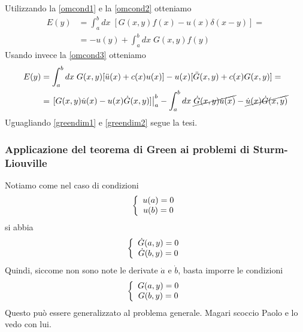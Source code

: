 Utilizzando la \ref{omcond1} e la \ref{omcond2} otteniamo
\begin{align}
	E(y) &= \int_{a}^{b} dx \; [G(x,y) f(x) - u(x)  \delta(x-y)] = \nonumber \\
		 &= -u(y) +\int_{a}^{b} dx \; G(x,y) f(y) \label{greendim1}
\end{align}
Usando invece la \ref{omcond3} otteniamo
\begin{align}
	E(y) &= \int_{a}^{b} dx \; G(x,y) [\ddot{u}(x) + c(x)u(x)] - u(x)  [\ddot{G}(x,y) + c(x) G(x,y)] = \nonumber\\
	&= \left.[G(x,y)\dot{u}(x) - u(x)\dot{G}(x,y)]\right|_a^b - \int_{a}^{b} dx \; \cancel{\dot{G}(x,y) \dot{u}(x)} - \cancel{\dot{u}(x) \dot{G}(x,y)}  \label{greendim2}
\end{align}
Uguagliando \ref{greendim1} e \ref{greendim2} segue la tesi.

\subsubsection{Applicazione del teorema di Green ai problemi di Sturm-Liouville}

Notiamo come nel caso di condizioni
\begin{align}
	\left\{ \begin{array}{cc} u(a)=0\\ u(b)=0 \end{array} \right.
\end{align}
si abbia
\begin{align}
	\left\{ \begin{array}{cc} \dot{G}(a,y)=0\\ \dot{G}(b,y)=0 \end{array} \right.
\end{align}
Quindi, siccome non sono note le derivate $\dot{a}$ e $\dot{b}$, basta imporre le condizioni
\begin{align}
	\left\{ \begin{array}{cc} G(a,y)=0\\ G(b,y)=0 \end{array} \right.
\end{align}
Questo può essere generalizzato al problema generale. Magari scoccio Paolo e lo vedo con lui.

